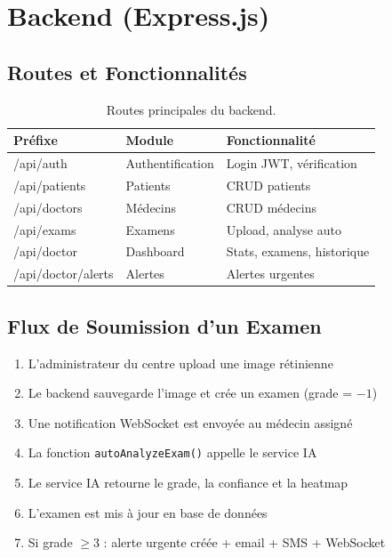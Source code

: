 \documentclass[12pt,a4paper,oneside]{report}
\begin{document}
\section{Backend (Express.js)}

\subsection{Routes et Fonctionnalités}

\begin{table}[H]
\centering
\caption{Routes principales du backend.}
\label{tab:backend_routes}
\begin{tabular}{|l|l|p{5.5cm}|}
\hline
\textbf{Préfixe} & \textbf{Module} & \textbf{Fonctionnalité} \\
\hline
/api/auth & Authentification & Login JWT, vérification \\
/api/patients & Patients & CRUD patients \\
/api/doctors & Médecins & CRUD médecins \\
/api/exams & Examens & Upload, analyse auto \\
/api/doctor & Dashboard & Stats, examens, historique \\
/api/doctor/alerts & Alertes & Alertes urgentes \\
\hline
\end{tabular}
\end{table}

\subsection{Flux de Soumission d'un Examen}

\begin{enumerate}
    \item L'administrateur du centre upload une image rétinienne
    \item Le backend sauvegarde l'image et crée un examen (grade = $-1$)
    \item Une notification WebSocket est envoyée au médecin assigné
    \item La fonction \texttt{autoAnalyzeExam()} appelle le service IA
    \item Le service IA retourne le grade, la confiance et la heatmap
    \item L'examen est mis à jour en base de données
    \item Si grade $\geq 3$ : alerte urgente créée + email + SMS + WebSocket
\end{enumerate}
\end{document}
